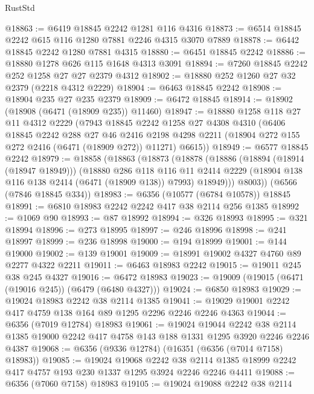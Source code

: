 \begin{lexlean}{RustStd}
\begin{coremodule}
@18863 := @6419 @18845 @2242 @1281 @116 @4316
@18873 := @6514 @18845 @2242 @615 @116 @1280 @7881 @2246 @4315 @3070 @7889
@18878 := @6442 @18845 @2242 @1280 @7881 @4315
@18880 := @6451 @18845 @2242
@18886 := @18880 @1278 @626 @115 @1648 @4313 @3091
@18894 := @7260 @18845 @2242 @252 @1258 @27 @27 @2379 @4312
@18902 := @18880 @252 @1260 @27 @32 @2379 (@2218 @4312 @2229)
@18904 := @6463 @18845 @2242
@18908 := @18904 @235 @27 @235 @2379
@18909 := @6472 @18845
@18914 := @18902 (@18908 (@6471 (@18909 @235)) @11460)
@18947 := @18880
    @1258
    @118
    @27
    @11
    @4312
    @2229
    (@7943
      @18845
      @2242
      @1258
      @27
      @4308
      @4310
      (@6406
        @18845
        @2242
        @288
        @27
        @46
        @2416
        @2198
        @4298
        @2211
        (@18904 @272 @155 @272 @2416 (@6471 (@18909 @272)) @11271)
        @6615))
@18949 := @6577 @18845 @2242
@18979 := @18858
    (@18863
      (@18873
        (@18878
          (@18886
            (@18894 (@18914 (@18947 @18949)))
            (@18880
              @286
              @118
              @116
              @11
              @2414
              @2229
              (@18904 @138 @116 @138 @2414 (@6471 (@18909 @138)) @7993)
              @18949)))
        @8003))
    (@6566 (@7846 @18845 @334))
@18983 := @6356 (@10577 (@6784 @10578)) @18845
@18991 := @6810 @18983 @2242 @2242 @417 @38 @2114 @256 @1385
@18992 := @1069 @90
@18993 := @87 @18992
@18994 := @326 @18993
@18995 := @321 @18994
@18996 := @273 @18995
@18997 := @246 @18996
@18998 := @241 @18997
@18999 := @236 @18998
@19000 := @194 @18999
@19001 := @144 @19000
@19002 := @139 @19001
@19009 := @18991 @19002 @4327 @4760 @89 @2277 @4322 @2211
@19011 := @6463 @18983 @2242
@19015 := @19011 @245 @38 @245 @4327
@19016 := @6472 @18983
@19023 := @19009 (@19015 (@6471 (@19016 @245)) (@6479 (@6480 @4327)))
@19024 := @6850 @18983
@19029 := @19024 @18983 @2242 @38 @2114 @1385
@19041 := @19029 @19001 @2242 @417 @4759 @138 @164 @89 @1295 @2296 @2246 @2246 @4363
@19044 := @6356 (@7019 @12784) @18983
@19061 := @19024
    @19044
    @2242
    @38
    @2114
    @1385
    @19000
    @2242
    @417
    @4758
    @143
    @188
    @1331
    @1295
    @3920
    @2246
    @2246
    @4387
@19068 := @6356 (@9336 @12784) (@16351 (@6356 (@7014 @7158) @18983))
@19085 := @19024
    @19068
    @2242
    @38
    @2114
    @1385
    @18999
    @2242
    @417
    @4757
    @193
    @230
    @1337
    @1295
    @3924
    @2246
    @2246
    @4411
@19088 := @6356 (@7060 @7158) @18983
@19105 := @19024
    @19088
    @2242
    @38
    @2114

\end{coremodule}
\end{lexlean}
